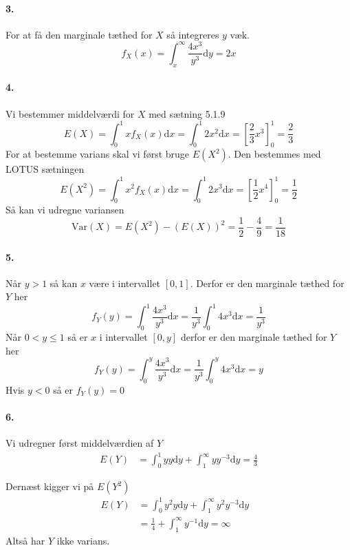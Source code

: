 \documentclass[12pt]{article}
\begin{document}
\paragraph{3.}
For at få den marginale tæthed for $X$ så integreres $y$ væk.
\[
    f_X(x)=\int_x^\infty \frac{4x^3}{y^3} \mathrm{d}y = 2x
\]
\paragraph{4.}
Vi bestemmer middelværdi for $X$ med sætning 5.1.9
\[
    E(X) = \int_0^1 xf_X(x)\mathrm{d}x = \int_0^1 2x^2 \mathrm{d}x = \left[ \frac{2}{3}x^3 \right]_0^1 = \frac{2}{3}
\]
For at bestemme varians skal vi først bruge $E(X^2)$. Den bestemmes med LOTUS sætningen
\[
    E(X^2) = \int_0^1 x^2 f_X(x)\mathrm{d}x = \int_0^1 2x^3 \mathrm{d}x = \left[ \frac{1}{2}x^4 \right]_0^1 = \frac{1}{2}
\]
Så kan vi udregne variansen
\[
    \mathrm{Var}(X) = E(X^2) - (E(X))^2 = \frac{1}{2} - \frac{4}{9} = \frac{1}{18}
\]

\paragraph{5.}
Når $y > 1$ så kan $x$ være i intervallet $[0,1]$. Derfor er den marginale tæthed for $Y$ her
\[
    f_Y(y) = \int_0^1 \frac{4x^3}{y^3} \mathrm{d}x = \frac{1}{y^3} \int_0^1 4x^3 \mathrm{d}x = \frac{1}{y^3}
\]
Når $0 < y \leq 1$ så er $x$ i intervallet $[0, y]$ derfor er den marginale tæthed for $Y$ her
\[
    f_Y(y) = \int_0^y \frac{4x^3}{y^3} \mathrm{d}x = \frac{1}{y^3} \int_0^y 4x^3 \mathrm{d}x = y
\]
Hvis $y < 0$ så er $f_Y(y) = 0$

\paragraph{6.}
Vi udregner først middelværdien af $Y$
\begin{align*}
    E(Y) &= \int_0^1 yy \mathrm{d}y + \int_1^\infty yy^{-3} \mathrm{d}y = \frac{4}{3}
\end{align*}

Dernæst kigger vi på $E(Y^2)$
\begin{align*}
  E(Y) &= \int_0^1 y^2y \mathrm{d}y + \int_1^\infty y^2y^{-3} \mathrm{d}y &\\
  &= \frac{1}{4} + \int_1^\infty y^{-1} \mathrm{d}y = \infty
\end{align*}
Altså har $Y$ ikke varians.
\end{document}

